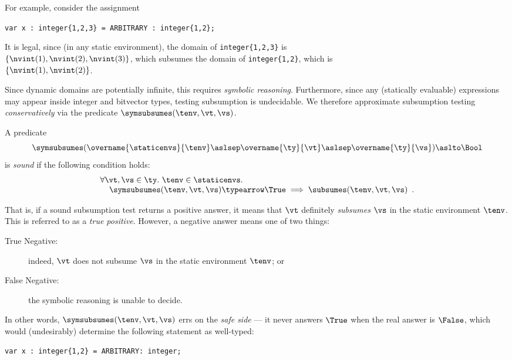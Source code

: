 For example, consider the assignment
\begin{center}
\verb|var x : integer{1,2,3} = ARBITRARY : integer{1,2};|
\end{center}

It is legal, since (in any static environment), the domain of \verb|integer{1,2,3}|
is \\
$\{\nvint(1), \nvint(2), \nvint(3)\}$, which subsumes
the domain of \verb|integer{1,2}|, which is \\ $\{\nvint(1), \nvint(2)\}$.

Since dynamic domains are potentially infinite, this requires \emph{symbolic reasoning}.
Furthermore, since any (statically evaluable) expressions may appear inside integer and bitvector
types, testing subsumption is undecidable.
We therefore approximate subsumption testing \emph{conservatively} via the predicate $\symsubsumes(\tenv, \vt, \vs)$.

\hypertarget{def-soundsubsumptiontest}{}
\begin{definition}
A predicate
\[
  \symsubsumes(\overname{\staticenvs}{\tenv} \aslsep \overname{\ty}{\vt} \aslsep \overname{\ty}{\vs}) \aslto \Bool
\]
is \emph{sound} if the following condition holds:
\begin{equation}
  \begin{array}{l}
  \forall \vt,\vs\in\ty.\ \tenv\in\staticenvs. \\
  \;\;\;\; \symsubsumes(\tenv, \vt, \vs) \typearrow \True \;\Longrightarrow\; \subsumes(\tenv, \vt, \vs)  \enspace.
  \end{array}
\end{equation}
\end{definition}

That is, if a sound subsumption test returns a positive answer, it means that
$\vt$ definitely \emph{subsumes} $\vs$ in the static environment $\tenv$.
This is referred to as a \emph{true positive}.
However, a negative answer means one of two things:
\begin{description}
  \item[True Negative:] indeed, $\vt$ does not subsume $\vs$ in the static environment $\tenv$; or
  \item[False Negative:] the symbolic reasoning is unable to decide.
\end{description}

In other words, $\symsubsumes(\tenv, \vt, \vs)$ errs on the \emph{safe side} ---
it never answers $\True$ when the real answer is $\False$, which would (undesirably)
determine the following statement as well-typed:
\begin{center}
  \verb|var x : integer{1,2} = ARBITRARY: integer;|
\end{center}

